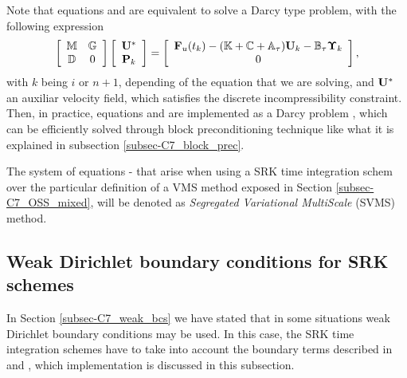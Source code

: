 Note that equations  and  are equivalent to solve a Darcy type problem, with the following expression
\begin{equation}
\label{eq-C7_SRK_upeta_RK_p_darcy}
\left[\begin{array}{cc}
\mathbb{M}&\mathbb{G}\\
\mathbb{D}&0
\end{array}\right]\left[\begin{array}{c}
{\bf U}^*\\
{\bf P}_k
\end{array}\right]=\left[\begin{array}{c}
{\bf F}_u(t_k)-(\mathbb{K}+\mathbb{C}+\mathbb{A}_\tau){\bf U}_k-\mathbb{B}_\tau\boldsymbol{\Upsilon}_k\\
0
\end{array}\right],
\end{equation}
with $k$ being $i$ or $n+1$, depending of the equation that we are solving, and ${\bf U}^*$ an auxiliar velocity field, which satisfies the discrete incompressibility constraint. Then, in practice, equations  and  are implemented as a Darcy problem , which can be efficiently solved through block preconditioning technique like what it is explained in subsection \ref{subsec-C7_block_prec}.

The system of equations - that arise when using a SRK time integration schem over the particular definition of a VMS method exposed in Section \ref{subsec-C7_OSS_mixed}, will be denoted as \textit{Segregated Variational MultiScale} (SVMS) method.

\subsection{Weak Dirichlet boundary conditions for SRK schemes}
In Section \ref{subsec-C7_weak_bcs} we have stated that in some situations weak Dirichlet boundary conditions may be used. In this case, the SRK time integration schemes have to take into account the boundary terms described in  and , which implementation is discussed in this subsection.

